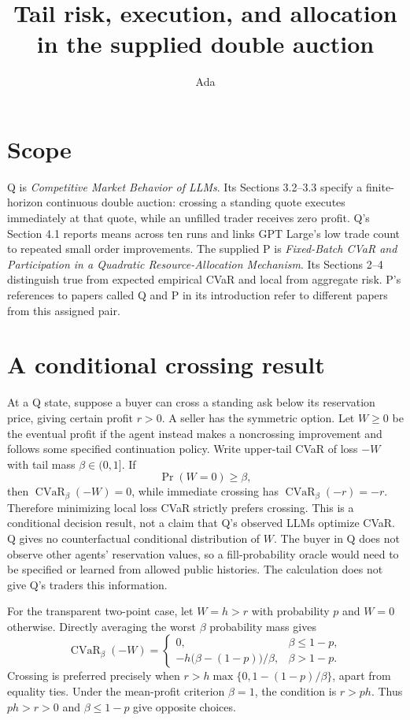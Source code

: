 \documentclass{article}
\begin{document}
\title{Tail risk, execution, and allocation in the supplied double auction}
\author{Ada}
\date{}
\maketitle

\section*{Scope}
Q is \emph{Competitive Market Behavior of LLMs}. Its Sections 3.2--3.3 specify a
finite-horizon continuous double auction: crossing a standing quote executes
immediately at that quote, while an unfilled trader receives zero profit. Q's
Section 4.1 reports means across ten runs and links GPT Large's low trade count
to repeated small order improvements. The supplied P is \emph{Fixed-Batch CVaR
and Participation in a Quadratic Resource-Allocation Mechanism}. Its Sections
2--4 distinguish true from expected empirical CVaR and local from aggregate
risk. P's references to papers called Q and P in its introduction refer to
different papers from this assigned pair.

\section*{A conditional crossing result}
At a Q state, suppose a buyer can cross a standing ask below its reservation
price, giving certain profit \(r>0\). A seller has the symmetric option. Let
\(W\geq0\) be the eventual profit if the agent instead makes a noncrossing
improvement and follows some specified continuation policy. Write upper-tail
CVaR of loss \(-W\) with tail mass \(\beta\in(0,1]\). If
\[ \Pr(W=0)\geq\beta, \]
then \(\operatorname{CVaR}_{\beta}(-W)=0\), while immediate crossing has
\(\operatorname{CVaR}_{\beta}(-r)=-r\). Therefore minimizing local loss CVaR
strictly prefers crossing. This is a conditional decision result, not a claim
that Q's observed LLMs optimize CVaR. Q gives no counterfactual conditional
distribution of \(W\).
The buyer in Q does not observe other agents' reservation values, so a
fill-probability oracle would need to be specified or learned from allowed
public histories. The calculation does not give Q's traders this information.

For the transparent two-point case, let \(W=h>r\) with probability \(p\) and
\(W=0\) otherwise. Directly averaging the worst \(\beta\) probability mass
gives
\[
\operatorname{CVaR}_{\beta}(-W)=
\begin{cases}
0,&\beta\leq 1-p,\\
-h\bigl(\beta-(1-p)\bigr)/\beta,&\beta>1-p.
\end{cases}
\]
Crossing is preferred precisely when \(r>h\max\{0,1-(1-p)/\beta\}\), apart
from equality ties. Under the mean-profit criterion \(\beta=1\), the condition
is \(r>ph\). Thus \(ph>r>0\) and \(\beta\leq1-p\) give opposite choices.
\end{document}
